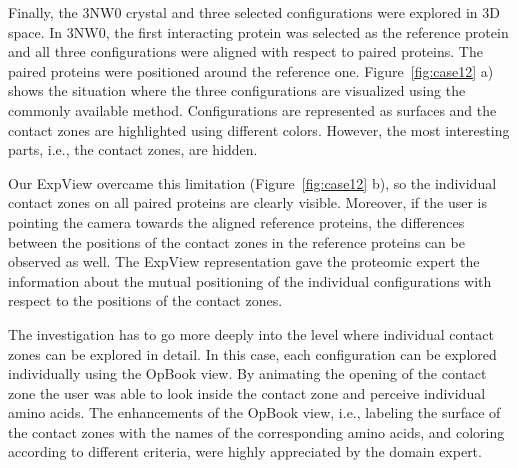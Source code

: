 \documentclass{bmcart}
\begin{document}

Finally, the 3NW0 crystal and three selected configurations were explored in 3D space.
In 3NW0, the first interacting protein was selected as the reference protein and all three configurations were aligned with respect to paired proteins.
The paired proteins were positioned around the reference one.
Figure~\ref{fig:case12} a) shows the situation where the three configurations are visualized using the commonly available method.
Configurations are represented as surfaces and the contact zones are highlighted using different colors.
However, the most interesting parts, i.e., the contact zones, are hidden.

Our ExpView overcame this limitation (Figure~\ref{fig:case12} b), so the individual contact zones on all paired proteins are clearly visible.
Moreover, if the user is pointing the camera towards the aligned reference proteins, the differences between the positions of the contact zones in the reference proteins can be observed as well.
The ExpView representation gave the proteomic expert the information about the mutual positioning of the individual configurations with respect to the positions of the contact zones.

The investigation has to go more deeply into the level where individual contact zones can be explored in detail.
In this case, each configuration can be explored individually using the OpBook view.
By animating the opening of the contact zone the user was able to look inside the contact zone and perceive individual amino acids.
The enhancements of the OpBook view, i.e., labeling the surface of the contact zones with the names of the corresponding amino acids, and coloring according to different criteria, were highly appreciated by the domain expert.
\end{document}
